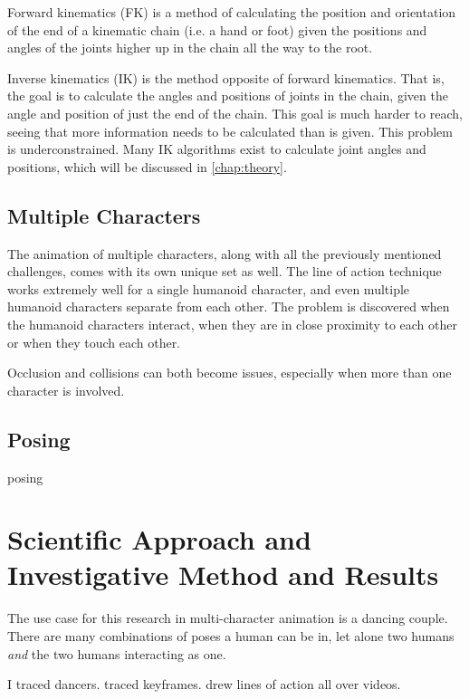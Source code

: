 Forward kinematics (FK) is a method of calculating the position and orientation of the end of a kinematic chain (i.e. a hand or foot) given the positions and angles of the joints higher up in the chain all the way to the root. 

Inverse kinematics (IK) is the method opposite of forward kinematics. That is, the goal is to calculate the angles and positions of joints in the chain, given the angle and position of just the end of the chain. This goal is much harder to reach, seeing that more information needs to be calculated than is given. This problem is underconstrained. Many IK algorithms exist to calculate joint angles and positions, which will be discussed in \autoref{chap:theory}.

\subsection{Multiple Characters}
The animation of multiple characters, along with all the previously mentioned challenges, comes with its own unique set as well. The line of action technique works extremely well for a single humanoid character, and even multiple humanoid characters separate from each other. The problem is discovered when the humanoid characters interact, when they are in close proximity to each other or when they touch each other.

Occlusion and collisions can both become issues, especially when more than one character is involved.

\subsection{Posing}
posing

\section{Scientific Approach and Investigative Method and Results}
The use case for this research in multi-character animation is a dancing couple. There are many combinations of poses a human can be in, let alone two humans \textit{and} the two humans interacting as one.

I traced dancers. traced keyframes. drew lines of action all over videos.

